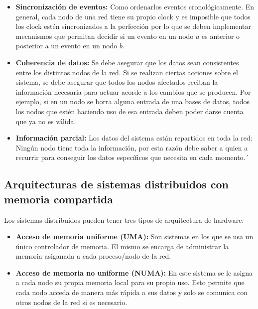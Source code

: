 \begin{itemize}
	\item \textbf{Sincronización de eventos:} Como ordenarlos eventos cronológicamente. En general, cada nodo de una red tiene su propio clock y es imposible que todos los clock estén sincronizados a la perfección por lo que se deben implementar mecanismos que permitan decidir si un evento en un nodo $a$ es anterior o posterior a un evento en un nodo $b$.
	\item \textbf{Coherencia de datos:} Se debe asegurar que los datos sean consistentes entre los distintos nodos de la red. Si se realizan ciertas acciones sobre el sistema, se debe asegurar que todos los nodos afectados reciban la información necesaria para actuar acorde a los cambios que se producen. Por ejemplo, si en un nodo se borra alguna entrada de una bases de datos, todos los nodos que estén haciendo uso de esa entrada deben poder darse cuenta que ya no es válida.
	\item \textbf{Información parcial:} Los datos del sistema están repartidos en toda la red: Ningún nodo tiene toda la información, por esta razón debe saber a quien a recurrir para conseguir los datos específicos que necesita en cada momento.´
\end{itemize}

\subsection{Arquitecturas de sistemas distribuidos con memoria compartida}

Los sistemas distribuidos pueden tener tres tipos de arquitectura de hardware:
\begin{itemize}
	\item \textbf{Acceso de memoria uniforme (UMA):} Son sistemas en los que se usa un único controlador de memoria. El mismo se encarga de administrar la memoria asiganada a cada proceso/nodo de la red.
	\item \textbf{Acceso de memoria  no uniforme (NUMA):}  En este sistema se le asigna a cada nodo su propia memoria local para su propio uso. Esto permite que cada nodo acceda de manera más rápida a sus datos y solo se comunica con otros nodos de la red si es necesario.
\end{itemize}

